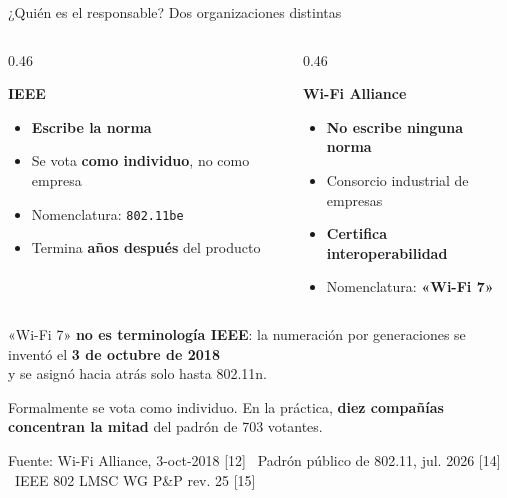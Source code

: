 \documentclass[aspectratio=169,10pt]{beamer}
\newcommand{\fuente}[1]{%
  \vfill{\scriptsize\color{tecgris} Fuente: #1\par}}
\newcommand{\destaca}[1]{{\color{acento}\textbf{#1}}}
\newcommand{\cita}[1]{{\color{tecazul}[#1]}}
\begin{document}
\begin{frame}{¿Quién es el responsable? Dos organizaciones distintas}
  \vspace{0.5em}
  \centering
  \begin{columns}[T,onlytextwidth]
    \begin{column}{0.46\textwidth}
      \begin{block}{\textbf{IEEE}}
        \small
        \begin{itemize}
          \item \textbf{Escribe la norma}
          \item Se vota \textbf{como individuo}, no como empresa
          \item Nomenclatura: \texttt{802.11be}
          \item Termina \textbf{años después} del producto
        \end{itemize}
      \end{block}
    \end{column}
    \begin{column}{0.46\textwidth}
      \begin{block}{\textbf{Wi-Fi Alliance}}
        \small
        \begin{itemize}
          \item \textbf{No escribe ninguna norma}
          \item Consorcio industrial de empresas
          \item \textbf{Certifica interoperabilidad}
          \item Nomenclatura: \textbf{«Wi-Fi 7»}
        \end{itemize}
      \end{block}
    \end{column}
  \end{columns}

  \vspace{1.0em}
  \begin{center}
    \small
    «Wi-Fi 7» \destaca{no es terminología IEEE}: la numeración por generaciones
    se inventó el \textbf{3 de octubre de 2018}\\ y se asignó hacia atrás solo hasta 802.11n.

    \vspace{0.7em}
    \color{tecgris}
    Formalmente se vota como individuo. En la práctica,
    \textbf{diez compañías concentran la mitad} del padrón de 703 votantes.
  \end{center}

  \fuente{Wi-Fi Alliance, 3-oct-2018 \cita{12} \textbullet\ Padrón público de 802.11, jul. 2026
          \cita{14} \textbullet\ IEEE 802 LMSC WG P\&P rev. 25 \cita{15}}
\end{frame}
\end{document}
